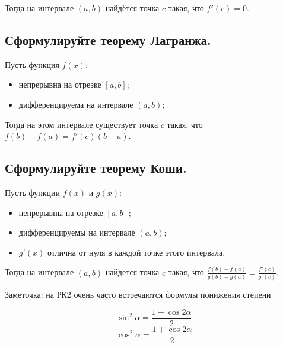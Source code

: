 Тогда на интервале $(a,b)$ найдётся точка $c$ такая, что $f'(c) = 0$.


\subsection{Сформулируйте теорему Лагранжа.}

Пусть функция $f(x)$:
\begin{itemize}
    \item непрерывна на отрезке $[a,b]$;
    \item дифференцируема на интервале $(a,b)$;
\end{itemize} 

Тогда на этом интервале существует точка $c$ такая, что $f(b) - f(a)=f'(c)(b - a)$.


\subsection{Сформулируйте теорему Коши.}

Пусть функции $f(x)$ и $g(x)$:
\begin{itemize}
    \item непрерывны на отрезке $[a,b]$;
    \item дифференцируемы на интервале $(a,b)$;
    \item $g'(x)$ отлична от нуля в каждой точке этого интервала. 
\end{itemize}

Тогда на интервале $(a, b)$ найдется точка $c$ такая, что $\frac{f(b)-f(a)}{g(b)-g(a)} = \frac{f'(c)}{g'(c)}$.

\vspace*{45pt}

\begin{myquote}
Заметочка: на РК2 очень часто встречаются формулы понижения степени

$$\sin^2\alpha = \frac{1 - \cos2\alpha}{2}$$
$$\cos^2\alpha = \frac{1 + \cos2\alpha}{2}$$
\end{myquote}


\newpage
\let\clearpage\relax




